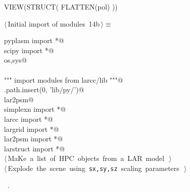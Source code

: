 \documentclass[11pt,oneside]{article}	%
\begin{document}
VIEW(STRUCT( FLATTEN(pol) ))


\begin{flushleft} \small \label{scrap29}
\protect{}$\langle\,$Initial import of modules\nobreak\ {\footnotesize 14b}$\,\rangle\equiv$
\vspace{-1ex}
\begin{list}{}{} \item
\mbox{}\verb@from pyplasm import *@\\
\mbox{}\verb@from scipy import *@\\
\mbox{}\verb@import os,sys@\\
\mbox{}\verb@@\\
\mbox{}\verb@""" import modules from larcc/lib """@\\
\mbox{}\verb@sys.path.insert(0, 'lib/py/')@\\
\mbox{}\verb@import lar2psm@\\
\mbox{}\verb@from simplexn import *@\\
\mbox{}\verb@from larcc import *@\\
\mbox{}\verb@from largrid import *@\\
\mbox{}\verb@from lar2psm import *@\\
\mbox{}\verb@from larstruct import *@\\
\mbox{}\verb@@\hbox{$\langle\,$MaKe a list of HPC objects from a LAR model\nobreak\ {\footnotesize {}}$\,\rangle$}\verb@@\\
\mbox{}\verb@@\hbox{$\langle\,$Explode the scene using \texttt{sx,sy,sz} scaling parameters\nobreak\ {\footnotesize {}}$\,\rangle$}\verb@@\\
\mbox{}\verb@@{\NWsep}
\end{list}
\vspace{-1ex}
\footnotesize\addtolength{\baselineskip}{-1ex}
\begin{list}{}{\setlength{\itemsep}{-\parsep}\setlength{\itemindent}{-\leftmargin}}
\item \NWtxtMacroRefIn\ .
\end{list}
\end{flushleft}
\end{document}
